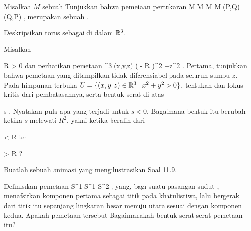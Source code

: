 {}
{

Misalkan $M$ sebuah
Tunjukkan bahwa pemetaan pertukaran
\maabbeledisp {} {M \times M} { M \times M
} {(P,Q)} {(Q,P)
} {,}
merupakan sebuah
.

}
{} {}

{}
{

Deskripsikan torus
 sebagai
di dalam ${\mathbb R}^3$.

}
{} {}

{}
{

Misalkan

\mavergleichskette
{\vergleichskette
{ R
}
{ > }{ 0
}
{  }{
}
{    }{
}
{   }{
}
}
{}{}{}
dan perhatikan pemetaan
\maabbeledisp {} { \R^3} { \R
} { (x,y,z) } { \left(  - R  \right)^2 +z^2
} {.}
Pertama, tunjukkan bahwa pemetaan yang ditampilkan tidak diferensiabel pada seluruh sumbu $z$. Pada himpunan terbuka
$U=\{(x,y,z)\in{\mathbb R}^3\mid x^2+y^2>0\}$, tentukan
dan lokus kritis dari pembatasannya, serta bentuk serat di atas

\mavergleichskette
{\vergleichskette
{ s
}
{ \in }{ \R
}
{  }{
}
{    }{
}
{   }{
}
}
{}{}{.}
Nyatakan pula apa yang terjadi untuk $s<0$. Bagaimana bentuk itu berubah ketika $s$ melewati $R^2$, yakni ketika beralih dari

\mavergleichskette
{\vergleichskette
{ 
}
{ < }{ R
}
{  }{
}
{    }{
}
{   }{
}
}
{}{}{}
ke

\mavergleichskette
{\vergleichskette
{ 
}
{ > }{ R
}
{  }{
}
{    }{
}
{   }{
}
}
{}{}{?}

}
{} {}

{}
{

Buatlah sebuah animasi yang mengilustrasikan
Soal 11.9.

}
{} {}

{}
{

Definisikan pemetaan
\maabbdisp {} {S^1 \times S^1} { S^2
} {,}
yang, bagi suatu pasangan sudut
\mathl{(\alpha, \beta)}{}, menafsirkan komponen pertama sebagai titik pada khatulistiwa, lalu bergerak dari titik itu sepanjang lingkaran besar menuju utara sesuai dengan komponen kedua. Apakah pemetaan tersebut
Bagaimanakah bentuk serat-serat pemetaan itu?

}
{} {}


